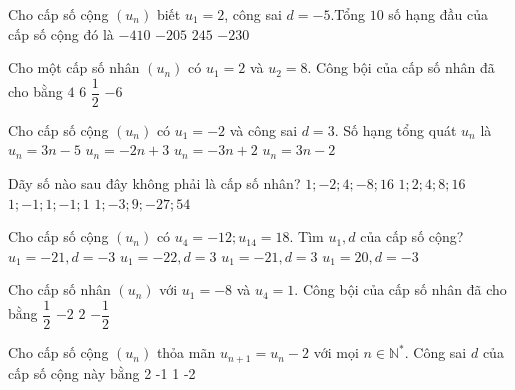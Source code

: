 \begin{ex}
Cho cấp số cộng $(u_n)$ biết $u_1=2$, công sai $d=-5$.Tổng $10$ số hạng đầu của cấp số cộng đó là
\choice
{$-410$}
{\True $-205$}
{$245$}
{$-230$}
\end{ex}
\begin{ex}
    Cho một cấp số nhân $(u_n)$ có $u_1=2$ và $u_2=8$. Công bội của cấp số nhân đã cho bằng
\choice
{\True $4$}
{$6$}
{$\dfrac{1}{2}$}
{$-6$}
\end{ex}
\begin{ex}
Cho cấp số cộng $(u_n)$ có $u_1=-2$ và công sai $d=3$. Số hạng tổng quát $u_n$ là
\choice
{$u_n=3n-5$}
{$u_n=-2n+3$}
{$u_n=-3n+2$}
{$u_n=3n-2$}
\end{ex}
\begin{ex}
Dãy số nào sau đây không phải là cấp số nhân?
\choice
{$1;-2;4;-8;16$}
{$1;2;4;8;16$}
{$1;-1;1;-1;1$}
{\True $1;-3;9;-27;54$}
\end{ex}
\begin{ex}
Cho cấp số cộng $(u_n)$ có $u_4=-12;u_{14}=18$. Tìm $u_1,d$ của cấp số cộng?
\choice
{$u_1=-21,d=-3$}
{$u_1=-22,d=3$}
{\True $u_1=-21,d=3$}
{$u_1=20,d=-3$}
\end{ex}
\begin{ex}
Cho cấp số nhân $(u_n)$ với $u_1=-8$ và $u_4=1$. Công bội của cấp số nhân đã cho bằng
\choice
{$\dfrac{1}{2}$}
{$-2$}
{$2$}
{\True $-\dfrac{1}{2}$}
\end{ex}
\begin{ex}
Cho cấp số cộng $(u_n)$ thỏa mãn $u_{n+1}=u_n-2$ với mọi $n\in \mathbb{N}^*$. Công sai $d$ của cấp số cộng này bằng
\choice
{2}
{-1}
{1}
{-2}
\end{ex}
